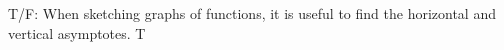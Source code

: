 {T/F: When sketching graphs of functions, it is useful to find the horizontal and vertical asymptotes.
}
{T
}
